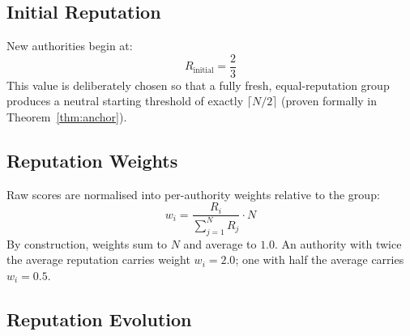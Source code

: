 \documentclass[12pt,a4paper]{article}
\theoremstyle{definition}
\theoremstyle{remark}
\begin{document}
\subsection{Initial Reputation}

New authorities begin at:
\begin{equation}
  R_{\text{initial}} = \frac{2}{3}
\end{equation}
This value is deliberately chosen so that a fully fresh, equal-reputation
group produces a neutral starting threshold of exactly $\lceil N/2 \rceil$
(proven formally in Theorem~\ref{thm:anchor}).

\subsection{Reputation Weights}

Raw scores are normalised into per-authority weights relative to the group:
\begin{equation}
  w_i = \frac{R_i}{\displaystyle\sum_{j=1}^{N} R_j} \cdot N
  \label{eq:weight}
\end{equation}
By construction, weights sum to $N$ and average to $1.0$.
An authority with twice the average reputation carries weight $w_i = 2.0$;
one with half the average carries $w_i = 0.5$.

\subsection{Reputation Evolution}
\end{document}
